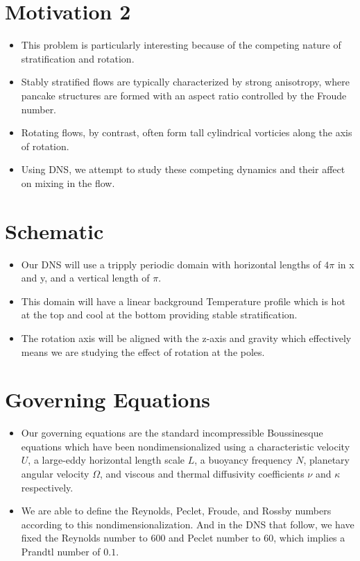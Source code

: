 \documentclass{article}
\begin{document}
\section{Motivation 2}
\begin{itemize}
    \item This problem is particularly interesting because of the competing
    nature of stratification and rotation.
    \item Stably stratified flows are typically characterized by strong
    anisotropy, where pancake structures are formed with an aspect ratio
    controlled by the Froude number. 
    \item Rotating flows, by contrast, often form tall cylindrical vorticies
    along the axis of rotation. 
    \item Using DNS, we attempt to study these competing dynamics and their
    affect on mixing in the flow. 
\end{itemize}

\section{Schematic}
\begin{itemize}
    \item Our DNS will use a tripply periodic domain with horizontal lengths of
    $4\pi$ in x and y, and a vertical length of $\pi$. 
    \item This domain will have a linear background Temperature profile which is
    hot at the top and cool at the bottom providing stable stratification. 
    \item The rotation axis will be aligned with the z-axis and gravity which
    effectively means we are studying the effect of rotation at the poles. 
\end{itemize}

\section{Governing Equations}
\begin{itemize}
    \item Our governing equations are the standard incompressible Boussinesque
    equations which have been nondimensionalized
    using a characteristic velocity $U$, a large-eddy horizontal length scale
    $L$, a buoyancy frequency $N$, planetary angular velocity $\Omega$, and
    viscous and thermal diffusivity coefficients $\nu$ and $\kappa$
    respectively. 
    \item We are able to define the Reynolds, Peclet, Froude, and Rossby numbers
    according to this nondimensionalization. And in the DNS that follow, we have
    fixed the Reynolds number to 600 and Peclet number to $60$, which implies a
    Prandtl number of $0.1$. 
\end{itemize}
\end{document}
